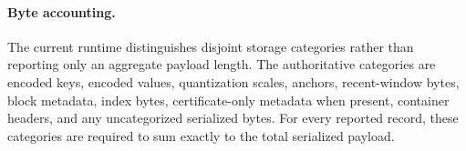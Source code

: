 \paragraph{Byte accounting.}
The current runtime distinguishes disjoint storage categories rather than reporting only an aggregate payload length. The authoritative categories are encoded keys, encoded values, quantization scales, anchors, recent-window bytes, block metadata, index bytes, certificate-only metadata when present, container headers, and any uncategorized serialized bytes. For every reported record, these categories are required to sum exactly to the total serialized payload.
